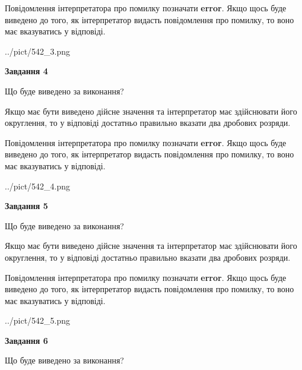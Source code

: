 \documentclass[12pt, ukrainian]{article}
\begin{document}
{\begin {Large}
Повідомлення інтерпретатора про помилку позначати \textbf{error}.
Якщо щось буде виведено до того, як інтерпретатор видасть повідомлення про помилку, 
то воно має вказуватись у відповіді. \par

\begin{center}
	{../pict/542_3.png}
\end{center}
\newpage

{\begin {center}\textbf{Завдання 4}\end {center}}\par
Що буде виведено за виконання? \par

Якщо має бути виведено дійсне значення та інтерпретатор має здійснювати його округлення, 
то у відповіді достатньо правильно вказати два дробових розряди.

Повідомлення інтерпретатора про помилку позначати \textbf{error}.
Якщо щось буде виведено до того, як інтерпретатор видасть повідомлення про помилку, 
то воно має вказуватись у відповіді. \par

\begin{center}
	{../pict/542_4.png}
\end{center}
\newpage

{\begin {center}\textbf{Завдання 5}\end {center}}\par
Що буде виведено за виконання? \par

Якщо має бути виведено дійсне значення та інтерпретатор має здійснювати його округлення, 
то у відповіді достатньо правильно вказати два дробових розряди.

Повідомлення інтерпретатора про помилку позначати \textbf{error}.
Якщо щось буде виведено до того, як інтерпретатор видасть повідомлення про помилку, 
то воно має вказуватись у відповіді. \par

\begin{center}
	{../pict/542_5.png}
\end{center}
\newpage

{\begin {center}\textbf{Завдання 6}\end {center}}\par
Що буде виведено за виконання? \par


\end{Large}}
\end{document}
